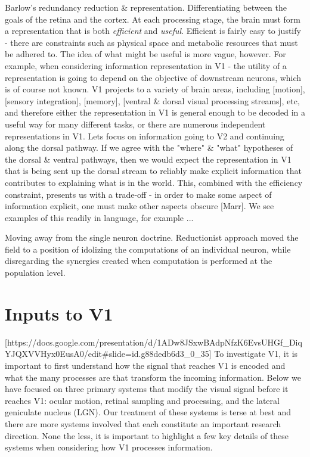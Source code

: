 Barlow's redundancy reduction \& representation. Differentiating between the goals of the retina and the cortex. At each processing stage, the brain must form a representation that is both \textit{efficient} and \textit{useful}. Efficient is fairly easy to justify - there are constraints such as physical space and metabolic resources that must be adhered to. The idea of what might be useful is more vague, however. For example, when considering information representation in V1 - the utility of a representation is going to depend on the objective of downstream neurons, which is of course not known. V1 projects to a variety of brain areas, including [motion], [sensory integration], [memory], [ventral \& dorsal visual processing streams], etc, and therefore either the representation in V1 is general enough to be decoded in a useful way for many different tasks, or there are numerous independent representations in V1. Lets focus on information going to V2 and continuing along the dorsal pathway. If we agree with the "where" \& "what" hypotheses of the dorsal \& ventral pathways, then we would expect the representation in V1 that is being sent up the dorsal stream to reliably make explicit information that contributes to explaining what is in the world. This, combined with the efficiency constraint, presents us with a trade-off - in order to make some aspect of information explicit, one must make other aspects obscure [Marr]. We see examples of this readily in language, for example ...

Moving away from the single neuron doctrine. Reductionist approach moved the field to a position of idolizing the computations of an individual neuron, while disregarding the synergies created when computation is performed at the population level.


\section{Inputs to V1}
[https://docs.google.com/presentation/d/1ADw8JSxwBAdpNfzK6EvsUHGf_DiqYJQXVVHyx0EusA0/edit#slide=id.g88dedb6d3_0_35]
To investigate V1, it is important to first understand how the signal that reaches V1 is encoded and what the many processes are that transform the incoming information. Below we have focused on three primary systems that modify the visual signal before it reaches V1: ocular motion, retinal sampling and processing, and the lateral geniculate nucleus (LGN). Our treatment of these systems is terse at best and there are more systems involved that each constitute an important research direction. None the less, it is important to highlight a few key details of these systems when considering how V1 processes information.


